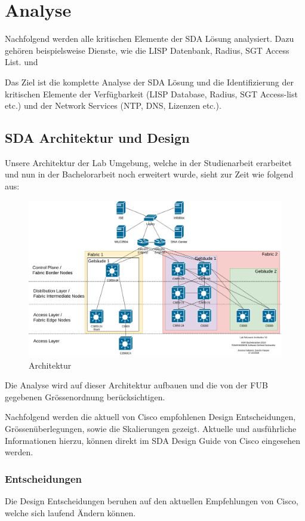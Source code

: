 \section{Analyse}
Nachfolgend werden alle kritischen Elemente der SDA Lösung analysiert. Dazu gehören beispielsweise Dienste, wie die LISP Datenbank, Radius, SGT Access List. und 

Das Ziel ist die komplette Analyse der SDA Lösung und die Identifizierung der kritischen Elemente der Verfügbarkeit (LISP Database, Radius, SGT Access-list etc.) und der Network Services (NTP, DNS, Lizenzen etc.).

\subsection{SDA Architektur und Design}
Unsere Architektur der Lab Umgebung, welche in der Studienarbeit erarbeitet und nun in der Bachelorarbeit noch erweitert wurde, sieht zur Zeit wie folgend aus:

\begin{figure}[H]
	\centering
	\includegraphics[width=1\linewidth]{img/Architecture/LabNetworkArchitecture-17-10}
	\caption{Architektur}
	\label{fig:Architektur}
\end{figure}

Die Analyse wird auf dieser Architektur aufbauen und die von der FUB gegebenen Grössenordnung berücksichtigen.

Nachfolgend werden die aktuell von Cisco empfohlenen Design Entscheidungen, Grössenüberlegungen, sowie die Skalierungen gezeigt. Aktuelle und ausführliche Informationen hierzu, können direkt im SDA Design Guide von Cisco \cite{sda-designguide} eingesehen werden. 

\subsubsection{Entscheidungen}
Die Design Entscheidungen beruhen auf den aktuellen Empfehlungen von Cisco, welche sich laufend Ändern können.

